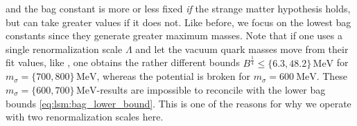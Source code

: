 and the bag constant is more or less fixed \emph{if} the strange matter hypothesis holds, but can take greater values if it does not.
Like before, we focus on the lowest bag constants since they generate greater maximum masses.
Note that if one uses a single renormalization scale $\Lambda$ and let the vacuum quark masses move from their fit values,
like \cite{ref:master_berge},
one obtains the rather different bounds $B^\frac14 \leq \{6.3,48.2\} \, \si{\mega\electronvolt}$ for $m_\sigma=\{700,800\}\,\si{\mega\electronvolt}$,
whereas the potential is broken for $m_\sigma=\SI{600}{\mega\electronvolt}$.
These $m_\sigma=\{600,700\}\,\si{\mega\electronvolt}$-results
are impossible to reconcile with the lower bag bounds \eqref{eq:lsm:bag_lower_bound}.
This is one of the reasons for why we operate with two renormalization scales here.

\makeatletter
\long{}%
\makeatother

